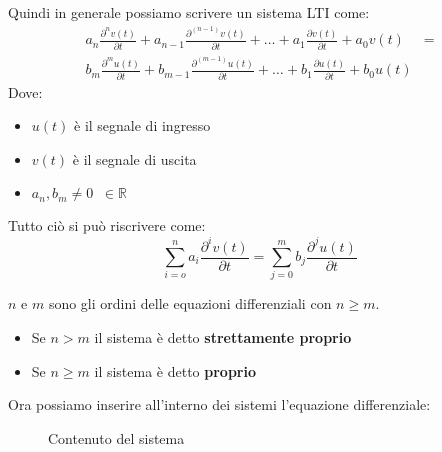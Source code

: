 \documentclass[a4paper]{article}
\begin{document}
Quindi in generale possiamo scrivere un sistema LTI come:
\[
  \begin{aligned}
    a_n \frac{\partial ^{n} v(t)}{\partial t} + a_{n-1} \frac{\partial ^{(n-1)} v(t)}{\partial t} + \ldots + a_1 \frac{\partial v(t)}{\partial t} + a_0 v(t) & =\\
    b_m \frac{\partial ^{m} u(t)}{\partial t} + b_{m-1} \frac{\partial ^{(m-1)} u(t)}{\partial t} + \ldots + b_1 \frac{\partial u(t)}{\partial t} + b_0 u(t) &
  \end{aligned}
\] 
Dove:
\begin{itemize}
  \item \( u(t) \) è il segnale di ingresso
  \item \( v(t) \) è il segnale di uscita
  \item \( a_n, b_m \neq 0 \;\; \in \mathbb{R} \) 
\end{itemize}
Tutto ciò si può riscrivere come:
\begin{equation}
  \sum_{i=o}^{n} a_i \frac{\partial^{i} v(t)}{\partial t} =
  \sum_{j=0}^{m} b_j \frac{\partial^{j} u(t)}{\partial t}
  \label{equazione-del-sistema}
\end{equation}
  
\( n \) e \( m \) sono gli ordini delle equazioni differenziali con \( n \ge m \).
\begin{itemize}
  \item Se \( n > m \) il sistema è detto \textbf{strettamente proprio}
  \item Se \( n \ge m \) il sistema è detto \textbf{proprio}

\end{itemize}

\noindent
Ora possiamo inserire all'interno dei sistemi l'equazione differenziale:
\begin{figure}[H]
  \centering
  \caption{Contenuto del sistema}
\end{figure}
\end{document}
